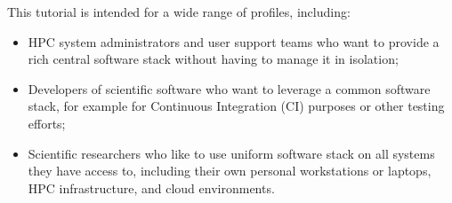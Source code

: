 This tutorial is intended for a wide range of profiles, including:

\begin{itemize}
    \item HPC system administrators and user support teams who want to provide a rich central software stack without
          having to manage it in isolation;
    \item Developers of scientific software who want to leverage a common software stack, for example for
          Continuous Integration (CI) purposes or other testing efforts;
    \item Scientific researchers who like to use uniform software stack on all systems they have access to,
          including their own personal workstations or laptops, HPC infrastructure, and cloud environments.
\end{itemize}

